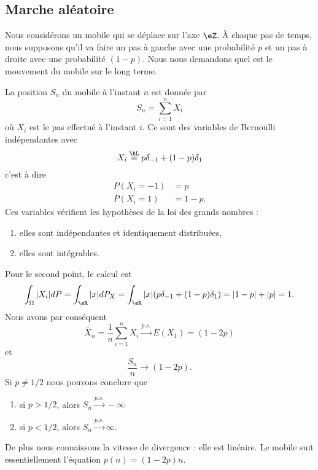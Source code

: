 \subsection{Marche aléatoire}

Nous considérons un mobile qui se déplace sur l'axe \( \eZ\). À chaque pas de temps, nous supposons qu'il va faire un pas à gauche avec une probabilité \( p\) et un pas à droite avec une probabilité \( (1-p)\). Nous nous demandons quel est le mouvement du mobile sur le long terme.

La position \( S_n\) du mobile à l'instant \( n\) est donnée par
\begin{equation}
    S_n=\sum_{i=1}^nX_i
\end{equation}
où \( X_i\) est le pas effectué à l'instant \( i\). Ce sont des variables de Bernoulli indépendantes avec
\begin{equation}
    X_i\stackrel{\hL}{=}p\delta_{-1}+(1-p)\delta_1
\end{equation}
c'est à dire
\begin{subequations}
    \begin{align}
        P(X_i=-1)&=p\\
        P(X_i=1)&=1-p.
    \end{align}
\end{subequations}
Ces variables vérifient les hypothèses de la loi des grands nombres :
\begin{enumerate}
    \item
        elles sont indépendantes et identiquement distribuées,
    \item
        elles sont intégrables.
\end{enumerate}
Pour le second point, le calcul est
\begin{equation}
    \int_{\Omega}| X_i |dP=\int_{\eR}| x |dP_X=\int_{\eR}| x |(p\delta_{-1}+(1-p)\delta_{1})=| 1-p |+| p |=1.
\end{equation}
Nous avons par conséquent
\begin{equation}
    \bar X_n=\frac{1}{ n }\sum_{i=1}^nX_i\stackrel{p.s.}{\longrightarrow} E(X_1)=(1-2p)
\end{equation}
et
\begin{equation}
    \frac{ S_n }{ n }\to(1-2p).
\end{equation}
Si \( p\neq 1/2\) nous pouvons conclure que
\begin{enumerate}
    \item
        si \( p>1/2\), alors \( S_n\stackrel{p.s.}{\longrightarrow}-\infty\)
    \item
        si \( p<1/2\), alors \( S_n\stackrel{p.s.}{\longrightarrow}\infty\).
\end{enumerate}
De plus nous connaissons la vitesse de divergence : elle est linéaire. Le mobile suit essentiellement l'équation
\( p(n)=(1-2p)n\).


